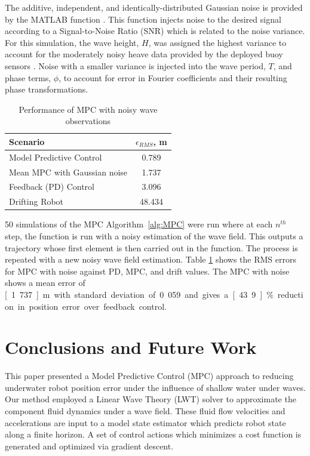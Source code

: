 \documentclass[letterpaper, 10 pt, conferences]{IEEEconf}  %
\begin{document}
The additive, independent, and identically-distributed Gaussian noise is provided by the MATLAB function . This function injects noise to the desired signal according to a Signal-to-Noise Ratio (SNR) which is related to the noise variance. For this simulation, the wave height, $H$, was assigned the highest variance to account for the moderately noisy heave data provided by the deployed buoy sensors \cite{goda}. Noise with a smaller variance is injected into the wave period, $T$, and phase terms, $\phi$, to account for error in Fourier coefficients and their resulting phase transformations.

\begin{table}[h]
\caption{Performance of MPC with noisy wave observations}
\begin{center}
\def\arraystretch{1.5}%
\begin{tabular}{ |l|c| } 
 \hline 
  Scenario & $\epsilon_{RMS}$, m \\ 
 \hline
 Model Predictive Control & 0.789 \\ 
 Mean MPC with Gaussian noise & 1.737 \\
 Feedback (PD) Control & 3.096 \\ 
 Drifting Robot & 48.434 \\
 \hline
\end{tabular}
\end{center}
\label{table:noiseData}
\end{table}

50 simulations of the MPC Algorithm~\ref{alg:MPC} were run where at each $n^{th}$ step, the function  is run with a noisy estimation of the wave field. This outputs a trajectory whose first element is then carried out in the  function. The process is repeated with a new noisy wave field estimation. Table \ref{table:noiseData} shows the RMS errors for MPC with noise against PD, MPC, and drift values. The MPC with noise shows a mean error of \unit[1.737]{m} with standard deviation of 0.059 and gives a \unit[43.9]{\%} reduction in position error over feedback control.

\section{Conclusions and Future Work} 
\label{sec:conclusion}

This paper presented a Model Predictive Control (MPC) approach to reducing underwater robot position error under the influence of shallow water under waves. Our method employed a Linear Wave Theory (LWT) solver to approximate the component fluid dynamics under a wave field. These fluid flow velocities and accelerations are input to a model state estimator which predicts robot state along a finite horizon. A set of control actions which minimizes a cost function is generated and optimized via gradient descent.
\end{document}

